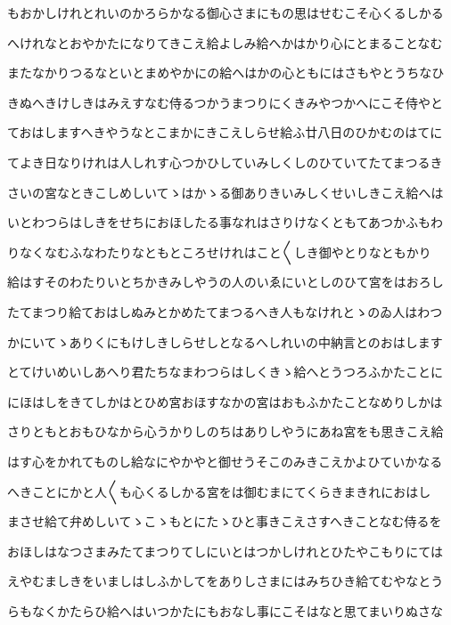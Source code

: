 \documentclass[a4paper,11pt,landscape]{ltjtarticle}
\begin{document}
\par\medskip
もおかしけれとれいのかろらかなる御心さまにもの思はせむこそ心くるしかる
\par\medskip
へけれなとおやかたになりてきこえ給よしみ給へかはかり心にとまることなむ
\par\medskip
またなかりつるなといとまめやかにの給へはかの心ともにはさもやとうちなひ
\par\medskip
きぬへきけしきはみえすなむ侍るつかうまつりにくきみやつかへにこそ侍やと
\par\medskip
ておはしますへきやうなとこまかにきこえしらせ給ふ廿八日のひかむのはてに
\par\medskip
てよき日なりけれは人しれす心つかひしていみしくしのひていてたてまつるき
\par\medskip
さいの宮なときこしめしいてゝはかゝる御ありきいみしくせいしきこえ給へは
\par\medskip
いとわつらはしきをせちにおほしたる事なれはさりけなくともてあつかふもわ
\par\medskip
りなくなむふなわたりなともところせけれはこと〱しき御やとりなともかり
\par\medskip
給はすそのわたりいとちかきみしやうの人のいゑにいとしのひて宮をはおろし
\par\medskip
たてまつり給ておはしぬみとかめたてまつるへき人もなけれとゝのゐ人はわつ
\par\medskip
かにいてゝありくにもけしきしらせしとなるへしれいの中納言とのおはします
\par\medskip
とてけいめいしあへり君たちなまわつらはしくきゝ給へとうつろふかたことに
\par\medskip
にほはしをきてしかはとひめ宮おほすなかの宮はおもふかたことなめりしかは
\par\medskip
さりともとおもひなから心うかりしのちはありしやうにあね宮をも思きこえ給
\par\medskip
はす心をかれてものし給なにやかやと御せうそこのみきこえかよひていかなる
\par\medskip
へきことにかと人〱も心くるしかる宮をは御むまにてくらきまきれにおはし
\par\medskip
まさせ給て弁めしいてゝこゝもとにたゝひと事きこえさすへきことなむ侍るを
\par\medskip
おほしはなつさまみたてまつりてしにいとはつかしけれとひたやこもりにては
\par\medskip
えやむましきをいましはしふかしてをありしさまにはみちひき給てむやなとう
\par\medskip
らもなくかたらひ給へはいつかたにもおなし事にこそはなと思てまいりぬさな
\end{document}
